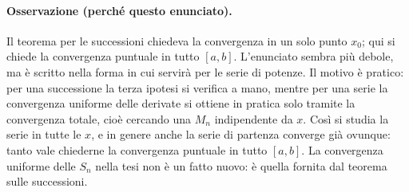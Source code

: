 \paragraph{Osservazione (perché questo enunciato).}
Il teorema per le successioni chiedeva la convergenza in un solo punto $x_0$;
qui si chiede la convergenza puntuale in tutto $[a,b]$. L'enunciato sembra più
debole, ma è scritto nella forma in cui servirà per le serie di potenze.
Il motivo è pratico: per una successione la terza ipotesi si verifica a mano,
mentre per una serie la convergenza uniforme delle derivate si ottiene in
pratica solo tramite la convergenza totale, cioè cercando una $M_n$
indipendente da $x$. Così si studia la serie in tutte le $x$, e in genere anche
la serie di partenza converge già ovunque: tanto vale chiederne la convergenza
puntuale in tutto $[a,b]$.
La convergenza uniforme delle $S_n$ nella tesi non è un fatto nuovo: è quella
fornita dal teorema sulle successioni.

